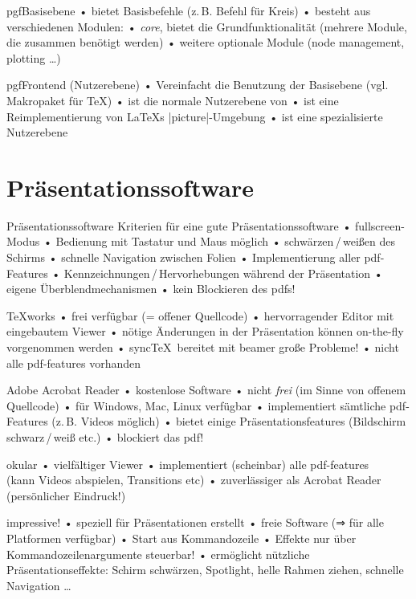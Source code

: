 \begin{frame}{pgf}{Basisebene}
• bietet Basisbefehle (z.\,B. Befehl für Kreis)
• besteht aus verschiedenen Modulen:
• \emph{core}, bietet die Grundfunktionalität (mehrere Module, die zusammen benötigt werden)
• weitere optionale Module (node management, plotting …)
\•
\end{frame}

\begin{frame}[fragile]{pgf}{Frontend (Nutzerebene)}
• Vereinfacht die Benutzung der Basisebene (vgl. Makropaket für \TeX)
• \TikZ ist die normale Nutzerebene von 
•  ist eine Reimplementierung von \LaTeX s |{picture}|-Umgebung
•  ist eine spezialisierte Nutzerebene
\•
\end{frame}

\section{Präsentationssoftware}

\begin{frame}{Präsentationssoftware}
Kriterien für eine gute Präsentationssoftware
• fullscreen-Modus
• Bedienung mit Tastatur und Maus möglich
• schwärzen\,/\,weißen des Schirms
• schnelle Navigation zwischen Folien
• Implementierung aller pdf-Features
• Kennzeichnungen\,/\,Hervorhebungen während der Präsentation
• eigene Überblendmechanismen
• kein Blockieren des pdfs!
\•
\end{frame}

\begin{frame}{\TeX works}
• frei verfügbar (= offener Quellcode)
• hervorragender Editor mit eingebautem Viewer
• nötige Änderungen in der Präsentation können on-the-fly vorgenommen werden
• sync\TeX\ bereitet mit beamer große Probleme!
• nicht alle pdf-features vorhanden
\•
\end{frame}

\begin{frame}{Adobe Acrobat Reader}
• kostenlose Software
• nicht \emph{frei} (im Sinne von offenem Quellcode)
• für Windows, Mac, Linux verfügbar
• implementiert sämtliche pdf-Features (z.\,B. Videos möglich)
• bietet einige Präsentationsfeatures (Bildschirm schwarz\,/\,weiß etc.)
• blockiert das pdf!
\•
\end{frame}

\begin{frame}{okular}
• vielfältiger Viewer
• implementiert (scheinbar) alle pdf-features\\%
(kann Videos abspielen, Transitions etc)
• zuverlässiger als Acrobat Reader (persönlicher Eindruck!)
\•
\end{frame}

\begin{frame}{impressive!}
• speziell für Präsentationen erstellt
• freie Software (⇒ für alle Platformen verfügbar)
• Start aus Kommandozeile
• Effekte nur über Kommandozeilenargumente steuerbar!
• ermöglicht nützliche Präsentationseffekte: Schirm schwärzen, Spotlight, helle Rahmen ziehen, schnelle Navigation …
\•
\end{frame}

